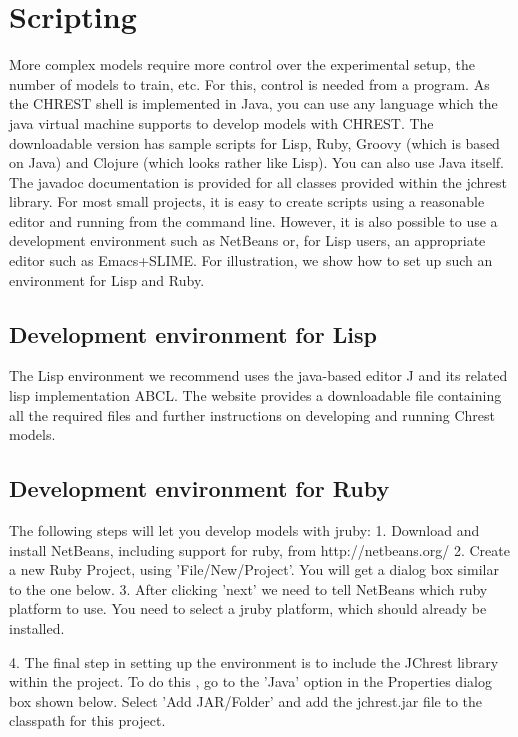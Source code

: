 \documentclass{article}
\begin{document}
\section{Scripting}

More complex models require more control over the experimental setup, the number of models to train, etc.  For this, control is needed from a program.  As the CHREST shell is implemented in Java, you can use any language which the java virtual machine supports to develop models with CHREST.  The downloadable version has sample scripts for Lisp, Ruby, Groovy (which is based on Java) and Clojure (which looks rather like Lisp).  You can also use Java itself.  The javadoc documentation is provided for all classes provided within the jchrest library.  
For most small projects, it is easy to create scripts using a reasonable editor and running from the command line.  However, it is also possible to use a development environment such as NetBeans or, for Lisp users, an appropriate editor such as Emacs+SLIME.  For illustration, we show how to set up such an environment for Lisp and Ruby.

\subsection{Development environment for Lisp}

The Lisp environment we recommend uses the java-based editor J and its related lisp implementation ABCL.  The website provides a downloadable file containing all the required files and further instructions on developing and running Chrest models.

\subsection{Development environment for Ruby}

The following steps will let you develop models with jruby:
1. Download and install NetBeans, including support for ruby, from http://netbeans.org/ 
2. Create a new Ruby Project, using 'File/New/Project'.  You will get a dialog box similar to the one below.
3. After clicking 'next' we need to tell NetBeans which ruby platform to use.  You need to select a jruby platform, which should already be installed.

4. The final step in setting up the environment is to include the JChrest library within the project. To do this , go to the 'Java' option in the Properties dialog box shown below. Select 'Add JAR/Folder' and add the jchrest.jar file to the classpath for this project. 
\end{document}
